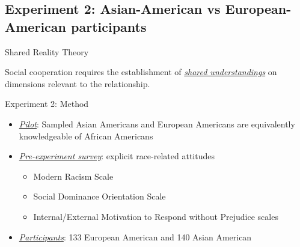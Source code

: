     \subsection{Experiment 2: Asian-American vs European-American participants}
    \begin{frame}{Shared Reality Theory}

        Social cooperation requires the establishment of \underline{\textit{shared understandings}} on dimensions relevant to the relationship.
        

        

    \end{frame}

    \begin{frame}{Experiment 2: Method}
        \begin{itemize}
            \item \underline{\textit{Pilot}}: Sampled Asian Americans and European Americans are equivalently knowledgeable of African Americans
            \item \underline{\textit{Pre-experiment survey}}: explicit race-related attitudes
            \begin{itemize}
                \item Modern Racism Scale \citep[\textcolor{lightlavender!55!white}{\textbf{MRS}};][]{mcconahay1981has}
                \item Social Dominance Orientation Scale \citep[\textcolor{lightlavender!55!white}{\textbf{SDO}};][]{pratto1994social}
                \item Internal/External Motivation to Respond without Prejudice scales \citep[\textcolor{lightlavender!55!white}{\textbf{IMS,EMS}};][]{plant1998internal}
            \end{itemize} 
            \item \underline{\textit{Participants}}: 133 European American and 140 Asian American
            
        \end{itemize}
    \end{frame}

